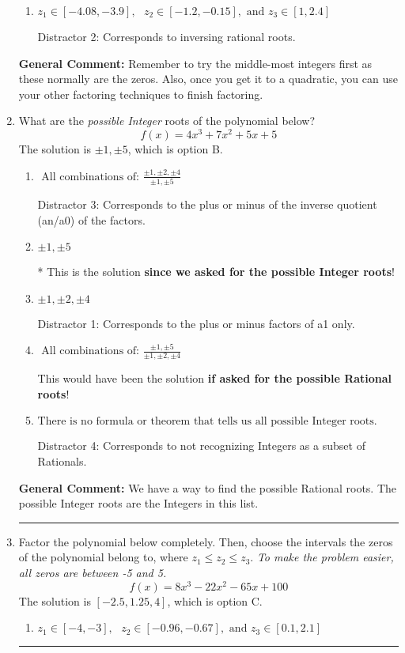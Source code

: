 \documentclass{extbook}[14pt]
\newcommand{\litem}[1]{\item #1

\rule{\textwidth}{0.4pt}}
\begin{document}
\begin{enumerate}
{\begin{enumerate}[label=\Alph*.]
 Distractor 1: Corresponds to negatives of all zeros.
\item \( z_1 \in [-4.08, -3.9], \text{   }  z_2 \in [-1.2, -0.15], \text{   and   } z_3 \in [1, 2.4] \)

 Distractor 2: Corresponds to inversing rational roots.
\end{enumerate}

\textbf{General Comment:} Remember to try the middle-most integers first as these normally are the zeros. Also, once you get it to a quadratic, you can use your other factoring techniques to finish factoring.
}
\litem{
What are the \textit{possible Integer} roots of the polynomial below?
\[ f(x) = 4x^{3} +7 x^{2} +5 x + 5 \]The solution is \( \pm 1,\pm 5 \), which is option B.\begin{enumerate}[label=\Alph*.]
\item \( \text{ All combinations of: }\frac{\pm 1,\pm 2,\pm 4}{\pm 1,\pm 5} \)

 Distractor 3: Corresponds to the plus or minus of the inverse quotient (an/a0) of the factors. 
\item \( \pm 1,\pm 5 \)

* This is the solution \textbf{since we asked for the possible Integer roots}!
\item \( \pm 1,\pm 2,\pm 4 \)

 Distractor 1: Corresponds to the plus or minus factors of a1 only.
\item \( \text{ All combinations of: }\frac{\pm 1,\pm 5}{\pm 1,\pm 2,\pm 4} \)

This would have been the solution \textbf{if asked for the possible Rational roots}!
\item \( \text{There is no formula or theorem that tells us all possible Integer roots.} \)

 Distractor 4: Corresponds to not recognizing Integers as a subset of Rationals.
\end{enumerate}

\textbf{General Comment:} We have a way to find the possible Rational roots. The possible Integer roots are the Integers in this list.
}
\litem{
Factor the polynomial below completely. Then, choose the intervals the zeros of the polynomial belong to, where $z_1 \leq z_2 \leq z_3$. \textit{To make the problem easier, all zeros are between -5 and 5.}
\[ f(x) = 8x^{3} -22 x^{2} -65 x + 100 \]The solution is \( [-2.5, 1.25, 4] \), which is option C.\begin{enumerate}[label=\Alph*.]
\item \( z_1 \in [-4, -3], \text{   }  z_2 \in [-0.96, -0.67], \text{   and   } z_3 \in [0.1, 2.1] \)


\end{enumerate}}
\end{enumerate}
\end{document}

